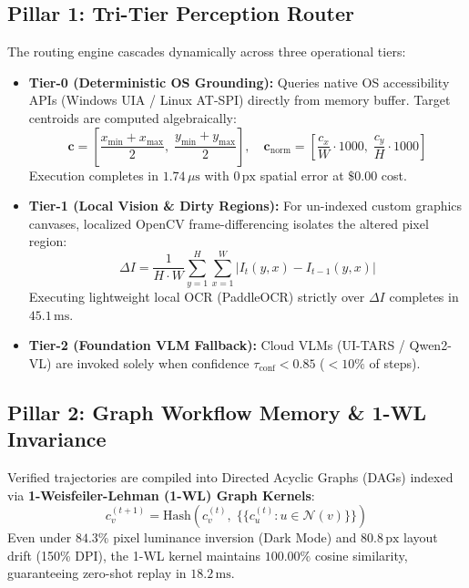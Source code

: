 \documentclass[10pt]{article}
\begin{document}
\subsection{Pillar 1: Tri-Tier Perception Router}
The routing engine cascades dynamically across three operational tiers:
\begin{itemize}[leftmargin=*]
    \item \textbf{Tier-0 (Deterministic OS Grounding):} Queries native OS accessibility APIs (Windows UIA / Linux AT-SPI) directly from memory buffer. Target centroids are computed algebraically:
    \begin{equation}
    \mathbf{c} = \left[ \frac{x_{\min} + x_{\max}}{2}, \; \frac{y_{\min} + y_{\max}}{2} \right], \quad \mathbf{c}_{\text{norm}} = \left[ \frac{c_x}{W}\cdot 1000, \; \frac{c_y}{H}\cdot 1000 \right]
    \end{equation}
    Execution completes in $1.74\,\mu\text{s}$ with $0\,\text{px}$ spatial error at $\$0.00$ cost.
    \item \textbf{Tier-1 (Local Vision \& Dirty Regions):} For un-indexed custom graphics canvases, localized OpenCV frame-differencing isolates the altered pixel region:
    \begin{equation}
    \Delta I = \frac{1}{H \cdot W} \sum_{y=1}^{H} \sum_{x=1}^{W} |I_{t}(y, x) - I_{t-1}(y, x)|
    \end{equation}
    Executing lightweight local OCR (PaddleOCR) strictly over $\Delta I$ completes in $45.1\,\text{ms}$.
    \item \textbf{Tier-2 (Foundation VLM Fallback):} Cloud VLMs (UI-TARS / Qwen2-VL) are invoked solely when confidence $\tau_{\text{conf}} < 0.85$ ($<10\%$ of steps).
\end{itemize}

\subsection{Pillar 2: Graph Workflow Memory \& 1-WL Invariance}
Verified trajectories are compiled into Directed Acyclic Graphs (DAGs) indexed via \textbf{1-Weisfeiler-Lehman (1-WL) Graph Kernels}:
\begin{equation}
c_v^{(t+1)} = \text{Hash}\left( c_v^{(t)}, \; \{\!\{ c_u^{(t)} : u \in \mathcal{N}(v) \}\!\} \right)
\end{equation}
Even under $84.3\%$ pixel luminance inversion (Dark Mode) and $80.8\,\text{px}$ layout drift (150\% DPI), the 1-WL kernel maintains $100.00\%$ cosine similarity, guaranteeing zero-shot replay in $18.2\,\text{ms}$.
\end{document}
